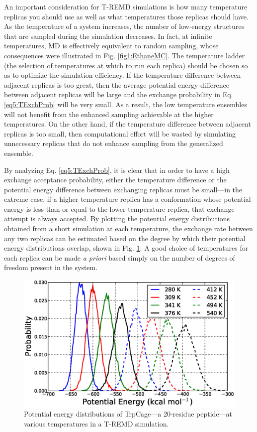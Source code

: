 An important consideration for T-REMD simulations is how many temperature
replicas you should use as well as what temperatures those replicas should have.
As the temperature of a system increases, the number of low-energy structures
that are sampled during the simulation decreases. In fact, at infinite
temperatures, MD is effectively equivalent to random sampling, whose
consequences were illustrated in Fig. \ref{fig1:EthaneMC}. The temperature
ladder (\ie the selection of temperatures at which to run each replica) should
be chosen so as to optimize the simulation efficiency. If the temperature
difference between adjacent replicas is too great, then the average potential
energy difference between adjacent replicas will be large and the exchange
probability in Eq. \ref{eq5:TExchProb} will be very small. As a result, the low
temperature ensembles will not benefit from the enhanced sampling achievable at
the higher temperatures. On the other hand, if the temperature difference
between adjacent replicas is too small, then computational effort will be wasted
by simulating unnecessary replicas that do not enhance sampling from the
generalized ensemble.

By analyzing Eq. \ref{eq5:TExchProb}, it is clear that in order to have a high
exchange acceptance probability, either the temperature difference or the
potential energy difference between exchanging replicas must be small---in the
extreme case, if a higher temperature replica has a conformation whose potential
energy is less than or equal to the lower-temperature replica, that exchange
attempt is always accepted. By plotting the potential energy distributions
obtained from a short simulation at each temperature, the exchange rate between
any two replicas can be estimated based on the degree by which their potential
energy distributions overlap, shown in Fig. \ref{fig5:TempOverlap}. A good
choice of temperatures for each replica can be made \emph{a priori} based simply
on the number of degrees of freedom present in the system.
\cite{TREMD_Predictor} 

\begin{figure}
   \includegraphics[width=6.5in]{TempOverlap.ps}
   \caption{Potential energy distributions of TrpCage---a 20-residue
            peptide---at various temperatures in a T-REMD simulation.}
   \label{fig5:TempOverlap}
\end{figure}

